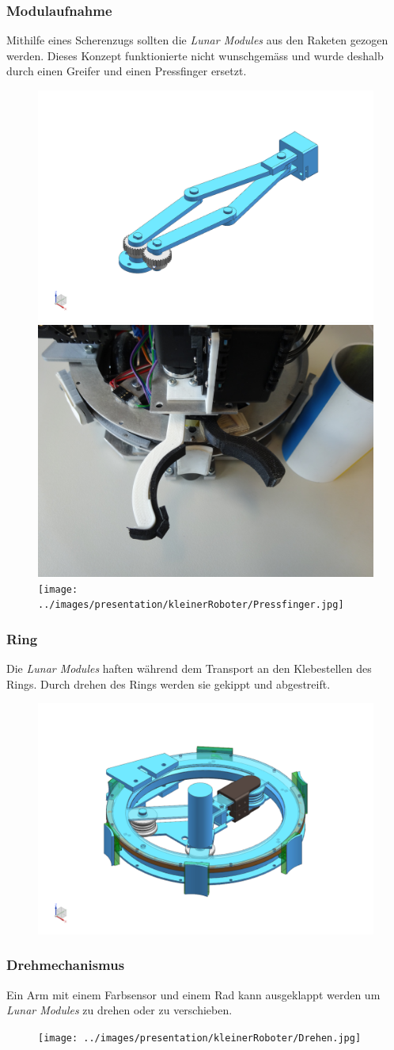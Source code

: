 \begin{frame}
	\frametitle{Modulaufnahme}
	Mithilfe eines Scherenzugs sollten die \textit{Lunar Modules} aus den Raketen gezogen werden.
	Dieses Konzept funktionierte nicht wunschgemäss und wurde deshalb durch einen Greifer und einen Pressfinger ersetzt.\\
	
	\begin{figure}
		\includegraphics[height = 3 cm]{../images/presentation/kleinerRoboter/Schere.png}
		\hspace{1em}
		\includegraphics[height = 3 cm]{../images/presentation/kleinerRoboter/Greifer.jpg}
		\hspace{2em}
		\texttt{[image: ../images/presentation/kleinerRoboter/Pressfinger.jpg]}
	\end{figure}
\end{frame}

\begin{frame}
	\frametitle{Ring}
	Die \textit{Lunar Modules} haften während dem Transport an den Klebestellen des Rings.
	Durch drehen des Rings werden sie gekippt und abgestreift.
	\begin{figure}
		\centering
		\includegraphics[height = 4 cm]{../images/presentation/kleinerRoboter/Ring.png}
	\end{figure}
\end{frame}

\begin{frame}
	\frametitle{Drehmechanismus}
	Ein Arm mit einem Farbsensor und einem Rad kann ausgeklappt werden um \textit{Lunar Modules} zu drehen oder zu verschieben.
	\begin{figure}
		\centering
		\texttt{[image: ../images/presentation/kleinerRoboter/Drehen.jpg]}
	\end{figure}
\end{frame}